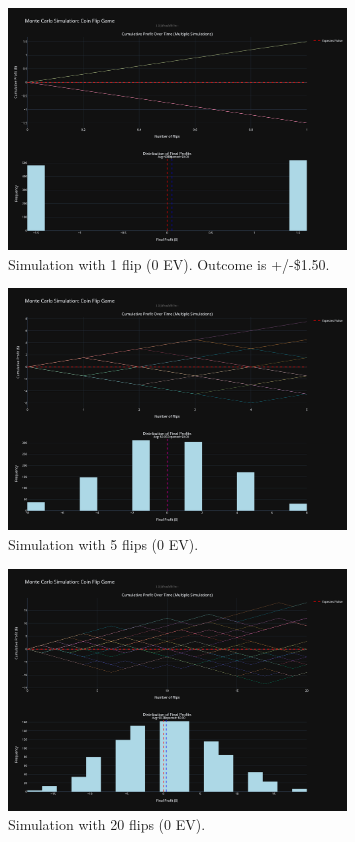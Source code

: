 \documentclass[12pt]{article}
\begin{document}
\begin{figure}[h!]
\centering
\includegraphics[width=0.8\textwidth]{nev/1nev.png}
\caption{Simulation with 1 flip (0 EV). Outcome is +/-\$1.50.}
\end{figure}

\begin{figure}[h!]
\centering
\includegraphics[width=0.8\textwidth]{nev/5nev.png}
\caption{Simulation with 5 flips (0 EV).}
\end{figure}
\clearpage

\begin{figure}[h!]
\centering
\includegraphics[width=0.8\textwidth]{nev/20nev.png}
\caption{Simulation with 20 flips (0 EV).}
\end{figure}
\end{document}
